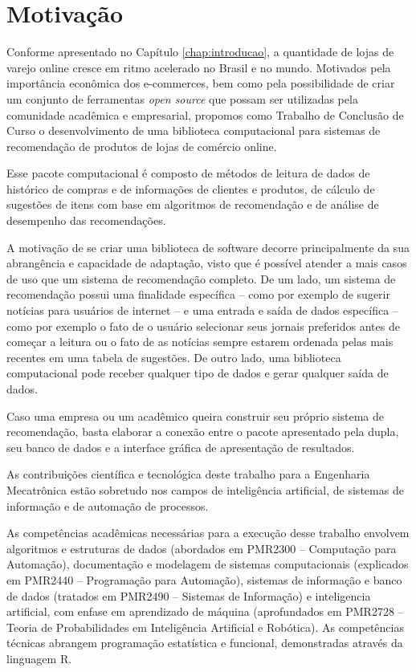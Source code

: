\chapter{Motivação} %
\label{cha:motivacao}

Conforme apresentado no Capítulo \ref{chap:introducao}, a quantidade de lojas de varejo online cresce em ritmo acelerado no Brasil e no mundo. Motivados pela importância econômica dos e-commerces, bem como pela possibilidade de criar um conjunto de ferramentas \textit{open source} que possam ser utilizadas pela comunidade acadêmica e empresarial, propomos como Trabalho de Conclusão de Curso o desenvolvimento de uma biblioteca computacional para sistemas de recomendação de produtos de lojas de comércio online.

Esse pacote computacional é composto de métodos de leitura de dados de histórico de compras e de informações de clientes e produtos, de cálculo de sugestões de itens com base em algoritmos de recomendação e de análise de desempenho das recomendações. 

A motivação de se criar uma biblioteca de software decorre principalmente da sua abrangência e capacidade de adaptação, visto que é possível atender a mais casos de uso que um sistema de recomendação completo. De um lado, um sistema de recomendação possui uma finalidade específica -- como por exemplo de sugerir notícias para usuários de internet -- e uma entrada e saída de dados específica -- como por exemplo o fato de o usuário selecionar seus jornais preferidos antes de começar a leitura ou o fato de as notícias sempre estarem ordenada pelas mais recentes em uma tabela de sugestões. De outro lado, uma biblioteca computacional pode receber qualquer tipo de dados e gerar qualquer saída de dados. 

Caso uma empresa ou um acadêmico queira construir seu próprio sistema de recomendação, basta elaborar a conexão entre o pacote apresentado pela dupla, seu banco de dados e a interface gráfica de apresentação de resultados.

As contribuições científica e tecnológica deste trabalho para a Engenharia Mecatrônica estão sobretudo nos campos de inteligência artificial, de sistemas de informação e de automação de processos.

As competências acadêmicas necessárias para a execução desse trabalho envolvem algoritmos e estruturas de dados (abordados em PMR2300 -- Computação para Automação), documentação e modelagem de sistemas computacionais (explicados em PMR2440 -- Programação para Automação), sistemas de informação e banco de dados (tratados em PMR2490 -- Sistemas de Informação) e inteligencia artificial, com enfase em aprendizado de máquina (aprofundados em PMR2728 -- Teoria de Probabilidades em Inteligência Artificial e Robótica). As competências técnicas abrangem programação estatística e funcional, demonstradas através da linguagem R.

